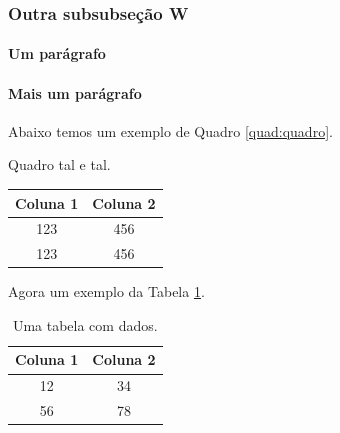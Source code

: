 \lipsum[2-4]	

\subsubsection{Outra subsubseção W}
	
\lipsum[2-4]	

\lipsum[2-4]		

\paragraph{Um parágrafo}

\lipsum[2-4]	
\lipsum[2-4]	
\paragraph{Mais um parágrafo}
\lipsum[2-4]	
\lipsum[2-4]	

Abaixo temos um exemplo de Quadro \ref{quad:quadro}.
\begin{quadro}
\centering
\caption{Quadro tal e tal.} \label{quad:quadro}
\begin{tabular}{c|c}
\hline
Coluna 1 & Coluna 2 \\
\hline
123 & 456\\
123 & 456\\
\hline
\end{tabular}

\end{quadro}

\lipsum[2-4]	
\lipsum[2-4]	


Agora um exemplo da Tabela \ref{tab:tabela}.

\begin{table}
	\centering
	\caption{Uma tabela com dados.}
	\label{tab:tabela}
	\begin{tabular}{|c|c|}
		\hline
		Coluna 1 & Coluna 2 \\
		\hline
		12 & 34 \\
		56 & 78 \\
		\hline	
	\end{tabular}
\end{table}

\lipsum[2-4]	
\lipsum[2-4]	

